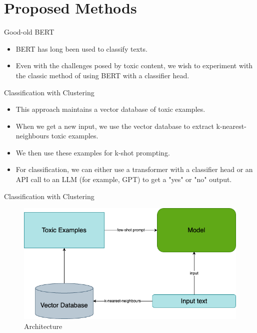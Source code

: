 \section{Proposed Methods}


\begin{frame}{Good-old BERT}

\begin{itemize}
    \item BERT has long been used to classify texts.
    \item Even with the challenges posed by toxic content, we wish to experiment with the classic method of using BERT with a classifier head.
\end{itemize}    

\end{frame}


\begin{frame}{Classification with Clustering}

\begin{itemize}
    \item This approach maintains a vector database of toxic examples.
    \item When we get a new input, we use the vector database to extract k-nearest-neighbours toxic examples.
    \item We then use these examples for k-shot prompting.
    \item For classification, we can either use a transformer with a classifier head or an API call to an LLM (for example, GPT) to get a "yes" or "no" output.
\end{itemize}
    
\end{frame}


\begin{frame}{Classification with Clustering}

\begin{figure}
    \centering
    \includegraphics[width=0.8\linewidth]{images/architecture.png}
    \caption{Architecture}
\end{figure}
    
\end{frame}
